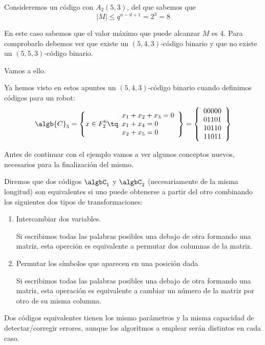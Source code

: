\begin{example}
Consideremos un código con $A_2(5,3)$, del que sabemos que
\[|M| \leq q^{n-d+1} = 2^3=8\]

En este caso sabemos que el valor máximo que puede alcanzar $M$ es 4. Para comprobarlo debemos ver que existe un $(5,4,3)$-código binario y que no existe un $(5,5,3)$-código binario.

Vamos a ello.

Ya hemos visto en estos apuntes un $(5,4,3)$-código binario cuando definimos códigos para un robot:
\[\algb{C}_5 = \left\{x\in F_2^6 \tq  \begin{array}{l}
x_1+x_2+x_3= 0 \\
x_1+x_4 = 0 \\
x_2+x_5 = 0
\end{array}\right\}=\left\{\begin{array}{l}
00000\\
01101\\
10110\\
11011
\end{array}\right\}\]

\end{example}

Antes de continuar con el ejemplo vamos a ver algunos conceptos nuevos, necesarios para la finalización del mismo.

\begin{defn}
Diremos que dos códigos $\algbC_1$ y $\algbC_2$ (necesariamente de la misma longitud) son equivalentes si uno puede obtenerse a partir del otro combinando los siguientes dos tipos de transformaciones:
\begin{enumerate}
\item Intercambiar dos variables.

Si escribimos todas las palabras posibles una debajo de otra formando una matriz, esta operción es equivalente a permutar dos columnas de la matriz.

\item Permutar los símbolos que aparecen en una posición dada

Si escribimos todas las palabras posibles una debajo de otra formando una matriz, esta operación es equivalente a cambiar un número de la matriz por otro de su misma columna.
\end{enumerate}
\end{defn}

\begin{prop}
Dos códigos equivalentes tienen los mismo parámetros y la misma capacidad de detectar/corregir errores, aunque los algoritmos a emplear serán distintos en cada caso.
\end{prop}

